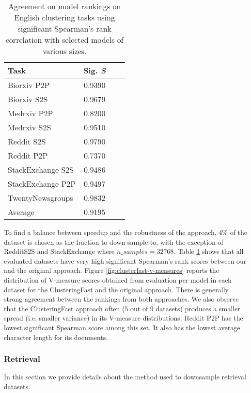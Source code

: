 \begin{table}[!ht]
    \centering
    \begin{tabular}{lccr}
    \toprule
        \textbf{Task} & Sig. \textit{S} \\ \midrule
        Biorxiv P2P & 0.9390 \\ 
        Biorxiv S2S & 0.9679 \\ 
        Medrxiv P2P & 0.8200 \\
        Medrxiv S2S & 0.9510 \\ 
        Reddit S2S & 0.9790 \\ 
        Reddit P2P & 0.7370 \\ 
        StackExchange S2S & 0.9486 \\ 
        StackExchange P2P & 0.9497 \\ 
        TwentyNewsgroups & 0.9832 \\ \midrule
        Average & 0.9195 \\ \bottomrule
    \end{tabular}
    \caption{Agreement on model rankings on English clustering tasks using significant Spearman's rank correlation with selected models of various sizes.}
    \label{table:appdx-cluster-rank-spearman}
\end{table}

To find a balance between speedup and the robustness of the approach, 4\% of the dataset is chosen as the fraction to down-sample to, with the exception of RedditS2S and StackExchange where $n\_samples=32768$. Table \ref{table:appdx-cluster-rank-spearman} shows that all evaluated datasets have very high significant Spearman's rank scores between our and the original approach. Figure \ref{fig:clusterfast-v-measures} reports the distribution of V-measure scores obtained from evaluation per model in each dataset for the ClusteringFast and the original approach. There is generally strong agreement between the rankings from both approaches. We also observe that the ClusteringFast approach often (5 out of 9 datasets) produces a smaller spread (i.e. smaller variance) in its V-measure distributions. Reddit P2P has the lowest significant Spearman score among this set. It also has the lowest average character length for its documents.


\subsubsection{Retrieval}
\label{app:retrieval_downsample}
In this section we provide details about the method used to downsample retrieval datasets.

